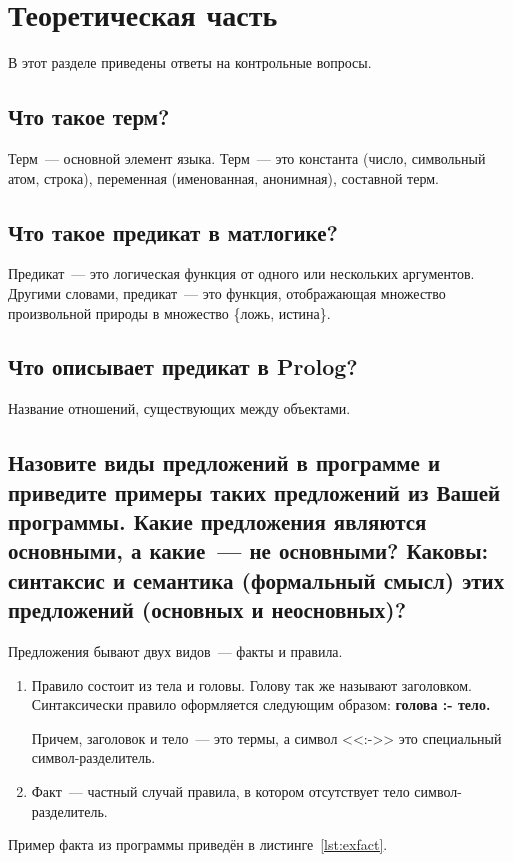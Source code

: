 \chapter{Теоретическая часть}

В этот разделе приведены ответы на контрольные вопросы.

\section{Что такое терм?}
Терм~--- основной элемент языка. Терм~--- это константа (число, символьный атом, строка), переменная (именованная, анонимная), составной терм.

\section{Что такое предикат в матлогике?}
Предикат~--- это логическая функция от одного или нескольких аргументов. Другими словами, предикат~--- это функция, отображающая множество произвольной природы в множество \{ложь, истина\}.

\section{Что описывает предикат в Prolog?}
Название отношений, существующих между объектами.

\section{Назовите виды предложений в программе и приведите примеры таких предложений из Вашей программы. Какие предложения являются основными, а какие~--- не основными? Каковы: синтаксис и семантика (формальный смысл) этих предложений (основных и неосновных)?}
Предложения бывают двух видов~--- факты и правила.
\begin{enumerate}
    \item Правило состоит из тела и головы. Голову так же называют заголовком. Синтаксически правило оформляется следующим образом: \textbf{голова :- тело.}

    Причем, заголовок и тело~--- это термы, а символ <<:->> это специальный символ-разделитель.
    \item Факт~--- частный случай правила, в котором отсутствует тело символ-разделитель.
\end{enumerate}

Пример факта из программы приведён в листинге~\ref{lst:exfact}.
\begin{lstlisting}[caption={Пример факта},label=lst:exfact]
\end{lstlisting}

